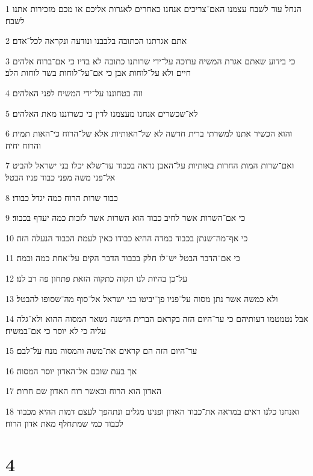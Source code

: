 \par 1 הנחל עוד לשבח עצמנו האם־צריכים אנחנו כאחרים לאגרות אליכם או מכם מזכירות אתנו לשבח׃
\par 2 אתם אגרתנו הכתובה בלבבנו ונודעה ונקראה לכל־אדם׃
\par 3 כי בידוע שאתם אגרת המשיח ערוכה על־ידי שרותנו כתובה לא בדיו כי אם־ברוח אלהים חיים ולא על־לוחות אבן כי אם־על־לוחות בשר לוחות הלב׃
\par 4 וזה בטחוננו על־ידי המשיח לפני האלהים׃
\par 5 לא־שכשרים אנחנו מעצמנו לדין כי כשרוננו מאת האלהים׃
\par 6 והוא הכשיר אתנו למשרתי ברית חדשה לא של־האותיות אלא של־הרוח כי־האות תמית והרוח יחיה׃
\par 7 ואם־שרות המות החרות באותיות על־האבן נראה בכבוד עד־שלא יכלו בני ישראל להביט אל־פני משה מפני כבוד פניו הבטל׃
\par 8 כבוד שרות הרוח כמה יגדל כבודו׃
\par 9 כי אם־השרות אשר לחיב כבוד הוא השרות אשר לזכות כמה יעדף בכבוד׃
\par 10 כי אף־מה־שנתן בכבוד כמדה ההיא כבודו כאין לעמת הכבוד הנעלה הזה׃
\par 11 כי אם־הדבר הבטל יש־לו חלק בכבוד הדבר הקים על־אחת כמה וכמה׃
\par 12 על־כן בהיות לנו תקוה כתקוה הזאת פתחון פה רב לנו׃
\par 13 ולא כמשה אשר נתן מסוה על־פניו פן־יביטו בני ישראל אל־סוף מה־שסופו להבטל׃
\par 14 אבל נטמטמו דעותיהם כי עד־היום הזה בקראם הברית הישנה נשאר המסוה ההוא ולא־גלה עליה כי לא יוסר כי אם־במשיח׃
\par 15 עד־היום הזה הם קראים את־משה והמסוה מנח על־לבם׃
\par 16 אך בעת שובם אל־האדון יוסר המסוה׃
\par 17 האדון הוא הרוח ובאשר רוח האדון שם חרות׃
\par 18 ואנחנו כלנו ראים במראה את־כבוד האדון ופנינו מגלים ונתהפך לעצם דמות ההיא מכבוד לכבוד כמי שמתחלף מאת אדון הרוח׃

\chapter{4}


